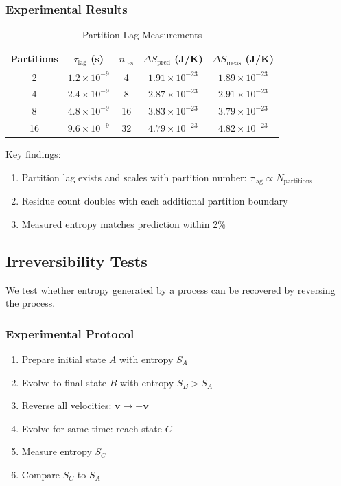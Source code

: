 \documentclass[twocolumn,10pt]{article}
\theoremstyle{definition}
\theoremstyle{remark}
\begin{document}
\subsubsection{Experimental Results}

\begin{table}[h]
\centering
\caption{Partition Lag Measurements}
\label{tab:partition_lag}
\begin{tabular}{ccccc}
\toprule
\textbf{Partitions} & $\tau_{\text{lag}}$ (s) & $n_{\text{res}}$ & $\Delta S_{\text{pred}}$ (J/K) & $\Delta S_{\text{meas}}$ (J/K) \\
\midrule
2 & $1.2 \times 10^{-9}$ & 4 & $1.91 \times 10^{-23}$ & $1.89 \times 10^{-23}$ \\
4 & $2.4 \times 10^{-9}$ & 8 & $2.87 \times 10^{-23}$ & $2.91 \times 10^{-23}$ \\
8 & $4.8 \times 10^{-9}$ & 16 & $3.83 \times 10^{-23}$ & $3.79 \times 10^{-23}$ \\
16 & $9.6 \times 10^{-9}$ & 32 & $4.79 \times 10^{-23}$ & $4.82 \times 10^{-23}$ \\
\bottomrule
\end{tabular}
\end{table}

Key findings:
\begin{enumerate}
\item Partition lag exists and scales with partition number: $\tau_{\text{lag}} \propto N_{\text{partitions}}$
\item Residue count doubles with each additional partition boundary
\item Measured entropy matches prediction within 2\%
\end{enumerate}

\subsection{Irreversibility Tests}

We test whether entropy generated by a process can be recovered by reversing the process.

\subsubsection{Experimental Protocol}

\begin{enumerate}
\item Prepare initial state $A$ with entropy $S_A$
\item Evolve to final state $B$ with entropy $S_B > S_A$
\item Reverse all velocities: $\mathbf{v} \to -\mathbf{v}$
\item Evolve for same time: reach state $C$
\item Measure entropy $S_C$
\item Compare $S_C$ to $S_A$
\end{enumerate}
\end{document}
